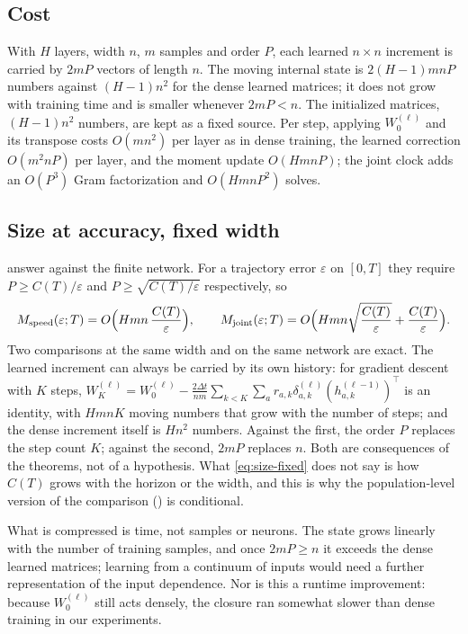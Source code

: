 \documentclass[11pt]{article}
\theoremstyle{definition}
\theoremstyle{remark}
\begin{document}
\subsection{Cost}

With $H$ layers, width $n$, $m$ samples and order $P$, each learned $n\times n$
increment is carried by $2mP$ vectors of length $n$.  The moving internal state
is $2(H-1)mnP$ numbers against $(H-1)n^2$ for the dense learned matrices; it does
not grow with training time and is smaller whenever $2mP<n$.  The initialized
matrices, $(H-1)n^2$ numbers, are kept as a fixed source.  Per step, applying
$W_0^{(\ell)}$ and its transpose costs $O(mn^2)$ per layer as in dense training,
the learned correction $O(m^2nP)$ per layer, and the moment update $O(HmnP)$;
the joint clock adds an $O(P^3)$ Gram factorization and $O(HmnP^2)$ solves.

\subsection{Size at accuracy, fixed width}
\label{sec:size}

 answer  against the finite network.  For
a trajectory error $\varepsilon$ on $[0,T]$ they require
$P\ge C(T)/\varepsilon$ and $P\ge\sqrt{C(T)/\varepsilon}$ respectively, so
\begin{equation}
 M_{\rm speed}(\varepsilon;T)=O\Bigl(Hmn\,\frac{C(T)}{\varepsilon}\Bigr),\qquad
 M_{\rm joint}(\varepsilon;T)=O\Bigl(Hmn\sqrt{\frac{C(T)}{\varepsilon}}
 +\frac{C(T)}{\varepsilon}\Bigr).
 \label{eq:size-fixed}
\end{equation}
Two comparisons at the same width and on the same network are exact.  The
learned increment can always be carried by its own history: for gradient
descent with $K$ steps,
$W^{(\ell)}_K=W^{(\ell)}_0-\frac{2\Delta t}{nm}\sum_{k<K}\sum_a
r_{a,k}\delta^{(\ell)}_{a,k}(h^{(\ell-1)}_{a,k})^\top$ is an identity, with
$HmnK$ moving numbers that grow with the number of steps; and the dense
increment itself is $Hn^2$ numbers.  Against the first, the order $P$ replaces
the step count $K$; against the second, $2mP$ replaces $n$.  Both are
consequences of the theorems, not of a hypothesis.  What
\eqref{eq:size-fixed} does not say is how $C(T)$ grows with the horizon or the
width, and this is why the population-level version of the comparison
() is conditional.

What is compressed is time, not samples or neurons.  The state grows linearly
with the number of training samples, and once $2mP\ge n$ it exceeds the dense
learned matrices; learning from a continuum of inputs would need a further
representation of the input dependence.  Nor is this a runtime improvement:
because $W_0^{(\ell)}$ still acts densely, the closure ran somewhat slower than
dense training in our experiments.
\end{document}
